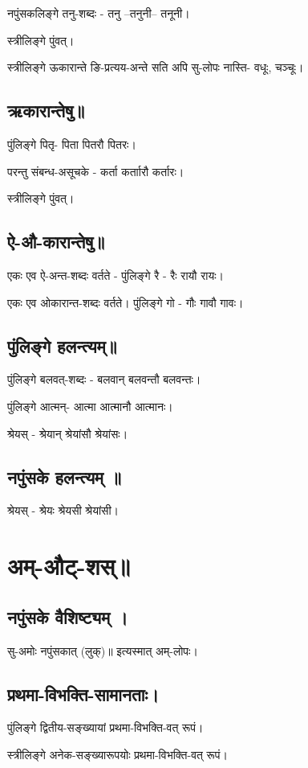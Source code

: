 \documentclass[oneside, article]{memoir}
\begin{document}
नपुंसकलिङ्गे तनु-शब्दः - तनु --तनुनी-- तनूनी।

स्त्रीलिङ्गे पुंवत्।

स्त्रीलिङ्गे ऊकारान्ते ङि-प्रत्यय-अन्ते सति अपि सु-लोपः नास्ति- वधूः, चञ्चूः। 

\subsection{ऋकारान्तेषु॥}
पुंलिङ्गे पितृ- पिता पितरौ पितरः।

परन्तु संबन्ध-असूचके - कर्ता कर्ताारौ कर्तारः। 

स्त्रीलिङ्गे पुंवत्।

\subsection{ऐ-औ-कारान्तेषु॥}
एकः एव ऐ-अन्त-शब्दः वर्तते - पुंलिङ्गे रै - रैः रायौ रायः।

एकः एव ओकारान्त-शब्दः वर्तते। पुंलिङ्गे गो - गौः गावौ गावः।

\subsection{पुंलिङ्गे हलन्त्यम्॥}
पुंलिङ्गे बलवत्-शब्दः - बलवान् बलवन्तौ बलवन्तः।

पुंलिङ्गे आत्मन्- आत्मा आत्मानौ आत्मानः।


श्रेयस् - श्रेयान् श्रेयांसौ श्रेयांसः।

\subsection{नपुंसके हलन्त्यम् ॥}
श्रेयस् - श्रेयः श्रेयसी श्रेयांसी।

\section{अम्-औट्-शस्॥}
\subsection{नपुंसके वैशिष्ट्यम् ।}
सु-अमोः नपुंसकात् (लुक्)॥ इत्यस्मात् अम्-लोपः।

\subsection{प्रथमा-विभक्ति-सामानताः।}
पुंलिङ्गे द्वितीय-सङ्ख्यायां प्रथमा-विभक्ति-वत् रूपं।

स्त्रीलिङ्गे अनेक-सङ्ख्यारूपयोः प्रथमा-विभक्ति-वत् रूपं।
\end{document}
